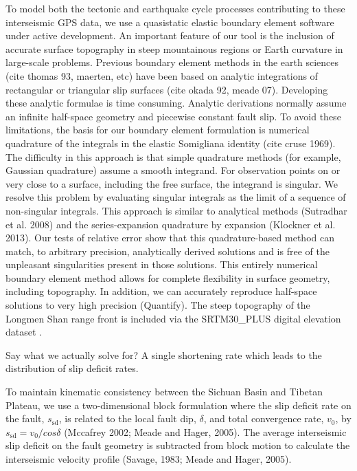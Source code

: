 \documentclass[12pt]{article}
\begin{document}
To model both the tectonic and earthquake cycle processes contributing to these interseismic GPS data, we use a quasistatic elastic boundary element software under active development. An important feature of our tool is the inclusion of accurate surface topography in steep mountainous regions or Earth curvature in large-scale problems. Previous boundary element methods in the earth sciences (cite thomas 93, maerten, etc) have been based on analytic integrations of rectangular or triangular slip surfaces (cite okada 92, meade 07). Developing these analytic formulae is time consuming. Analytic derivations normally assume an infinite half-space geometry and piecewise constant fault slip. To avoid these limitations, the basis for our boundary element formulation is numerical quadrature of the integrals in the elastic Somigliana identity (cite cruse 1969). The difficulty in this approach is that simple quadrature methods (for example, Gaussian quadrature) assume a smooth integrand. For observation points on or very close to a surface, including the free surface, the integrand is singular. We resolve this problem by evaluating singular integrals as the limit of a sequence of non-singular integrals. This approach is similar to analytical methods (Sutradhar et al. 2008) and the series-expansion quadrature by expansion (Klockner et al. 2013). Our tests of relative error show that this quadrature-based method can match, to arbitrary precision, analytically derived solutions and is free of the unpleasant singularities present in those solutions. This entirely numerical boundary element method allows for complete flexibility in surface geometry, including topography. In addition, we can accurately reproduce half-space solutions to very high precision (Quantify). The steep topography of the Longmen Shan range front is included via the SRTM30\_PLUS digital elevation dataset \citep{Becker2009}.

   Say what we actually solve for?  A single shortening rate which leads to the distribution of slip deficit rates.

To maintain kinematic consistency between the Sichuan Basin and Tibetan Plateau, we use a two-dimensional block formulation where the slip deficit rate on the fault, $s_\mathrm{sd}$, is related to the local fault dip, $\delta$, and total convergence rate, $v_0$, by $s_\mathrm{sd}=v_0 / cos\delta$ (Mccafrey 2002; Meade and Hager, 2005). The average interseismic slip deficit on the fault geometry is subtracted from block motion to calculate the interseismic velocity profile (Savage, 1983; Meade and Hager, 2005).
\end{document}
